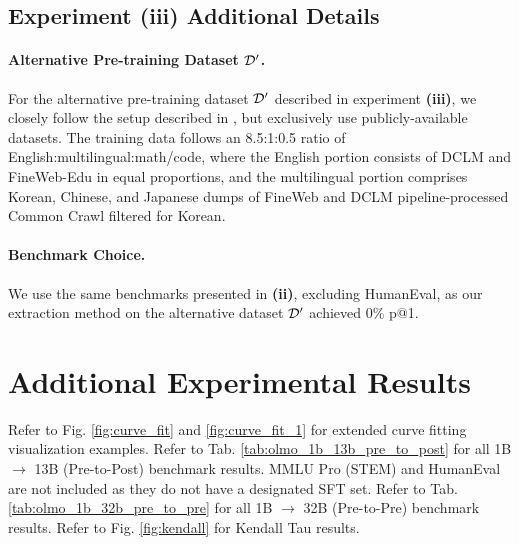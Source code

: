 \begin{table}[ht]
    \centering
    \caption{Hyperparameters for SFT}
    \label{tab:hyperparams}
\end{table}

\subsection{Experiment (iii) Additional Details} 

\paragraph{Alternative Pre-training Dataset $\mathcal{D}'$.} For the alternative pre-training dataset $\mathcal{D}'$  described in experiment \textbf{(iii)}, we closely follow the setup described in \cite{han2025trillion}, but exclusively use publicly-available datasets. The training data follows an 8.5:1:0.5 ratio of English:multilingual:math/code, where the English portion consists of DCLM and FineWeb-Edu in equal proportions, and the multilingual portion comprises Korean, Chinese, and Japanese dumps of FineWeb and DCLM pipeline-processed Common Crawl filtered for Korean. 

\paragraph{Benchmark Choice.} We use the same benchmarks presented in \textbf{(ii)}, excluding HumanEval, as our extraction method on the alternative dataset $\mathcal{D}'$ achieved 0\% p@1.

\section{Additional Experimental Results} \label{app:more_exp}

Refer to Fig. \ref{fig:curve_fit} and \ref{fig:curve_fit_1} for extended curve fitting visualization examples. Refer to Tab. \ref{tab:olmo_1b_13b_pre_to_post} for all 1B $\rightarrow$ 13B (Pre-to-Post) benchmark results. MMLU Pro (STEM) and HumanEval are not included as they do not have a designated SFT set. Refer to Tab. \ref{tab:olmo_1b_32b_pre_to_pre} for all 1B $\rightarrow$ 32B (Pre-to-Pre) benchmark results. Refer to Fig. \ref{fig:kendall} for Kendall Tau results.

